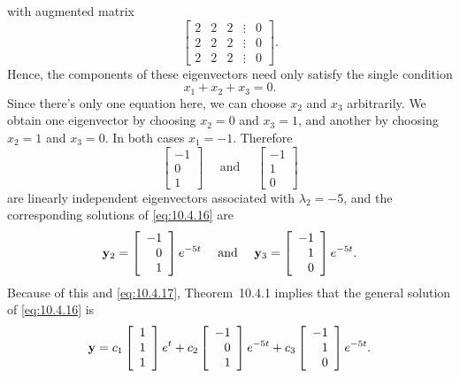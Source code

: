 \begin{examplesolution}
with augmented matrix
\[
  \left[
  \begin{array}{rrrcr}
    2 & 2 & 2 & \vdots & 0 \\
    2 & 2 & 2 & \vdots & 0 \\
    2 & 2 & 2 & \vdots & 0
  \end{array}\right].
\]
Hence, the components of these eigenvectors need only satisfy the single condition
\[
  x_{1}+x_{2}+x_{3}=0.
\]
Since there's only one equation here, we can choose $x_{2}$ and $x_{3}$ arbitrarily. We obtain one
eigenvector by choosing $x_{2}=0$ and $x_{3}=1$, and another by choosing $x_{2}=1$ and $x_{3}=0$. In
both cases $x_{1}=-1$. Therefore
\[
  \left[
  \begin{array}{r}
    -1 \\
    0  \\
    1
  \end{array}\right]\quad \mbox{ and }\quad\left[
  \begin{array}{r}
    -1 \\
    1  \\
    0
  \end{array}\right]
\]
are linearly independent eigenvectors associated with $\lambda_{2}= -5$, and the corresponding
solutions of \eqref{eq:10.4.16} are
\[
  {\bf y}_{2}=\left[
  \begin{array}{r}
    -1 \\
    0  \\
    1
  \end{array}
  \right]e^{-5t}\quad \mbox{ and }\quad{\bf y}_{3}=\left[
  \begin{array}{r}
    -1 \\
    1  \\
    0
  \end{array}\right]e^{-5t}.
\]
Because of this and \eqref{eq:10.4.17}, Theorem~10.4.1 implies that the general
solution of \eqref{eq:10.4.16} is
\[
  {\bf y}=c_{1}\left[
  \begin{array}{r}
    1 \\
    1 \\
    1
  \end{array}\right]e^{t}+c_{2}\left[
  \begin{array}{r}
    -1 \\
    0  \\
    1
  \end{array}\right] e^{-5t}+c_{3}\left[
  \begin{array}{r}
    -1 \\
    1  \\
    0
  \end{array}
  \right]e^{-5t}.
\]
\end{examplesolution}

